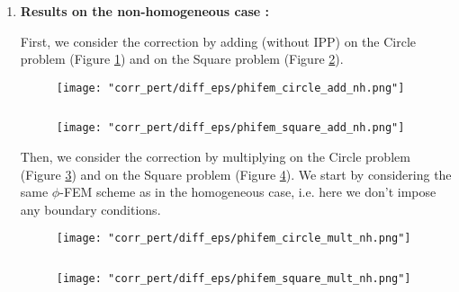 \begin{enumerate}[label=\textbullet]
	\item \textbf{Results on the non-homogeneous case :}
	
	First, we consider the correction by adding (without IPP) on the Circle problem (Figure \ref{corr_pert_phifem_circle_add_nh}) and on the Square problem (Figure \ref{corr_pert_phifem_square_add_nh}).
	
	\begin{minipage}{0.48\linewidth}
		\begin{figure}[H]
			\centering
			\texttt{[image: "corr\_pert/diff\_eps/phifem\_circle\_add\_nh.png"]}
			\label{corr_pert_phifem_circle_add_nh}
		\end{figure} 
	\end{minipage} $\qquad$
	\begin{minipage}{0.48\linewidth}
		\begin{figure}[H]
			\centering
			\texttt{[image: "corr\_pert/diff\_eps/phifem\_square\_add\_nh.png"]}
			\label{corr_pert_phifem_square_add_nh}
		\end{figure} 
	\end{minipage}
	
	Then, we consider the correction by multiplying on the Circle problem (Figure \ref{corr_pert_phifem_circle_mult_nh}) and on the Square problem (Figure \ref{corr_pert_phifem_square_mult_nh}). We start by considering the same $\phi$-FEM scheme as in the homogeneous case, i.e. here we don't impose any boundary conditions.
	
	\begin{minipage}{0.48\linewidth}
		\begin{figure}[H]
			\centering
			\texttt{[image: "corr\_pert/diff\_eps/phifem\_circle\_mult\_nh.png"]}
			\label{corr_pert_phifem_circle_mult_nh}
		\end{figure} 
	\end{minipage} $\qquad$
	\begin{minipage}{0.48\linewidth}
		\begin{figure}[H]
			\centering
			\texttt{[image: "corr\_pert/diff\_eps/phifem\_square\_mult\_nh.png"]}
			\label{corr_pert_phifem_square_mult_nh}
		\end{figure} 
	\end{minipage}
	

\end{enumerate}
